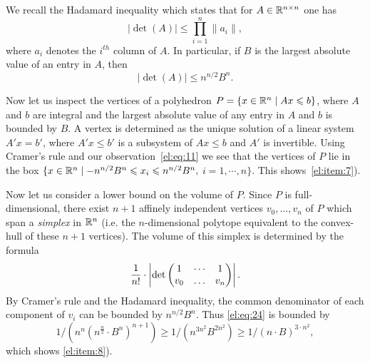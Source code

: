 We recall the Hadamard inequality which states that for $A \in
\mathbb{R}^{n\times n}$ one has 
\begin{equation}
  \label{el:eq:10}
  |\det(A)| \leq \prod_{i=1}^n \|a_i\|,
\end{equation}
where $a_i$ denotes the $i^{th}$ column of $A$.  In particular, if $B$
is the largest absolute value of an entry in $A$, then 
\begin{equation}
  \label{el:eq:11}
  |\det(A)| \leq n^{n/2} B^{n}. 
\end{equation}



Now let us inspect the vertices of a polyhedron $P = \{ x \in \mathbb{R}^n \mid
Ax\leqslant b\}$, where $A$ and $b$ are integral and the largest absolute
value of any entry in $A$ and $b$ is bounded by $B$. A vertex is
determined as the unique solution of a linear system $A'x=b'$, where
$A'x\leq b'$ is a subsystem of $Ax\leq b$ and $A'$ is invertible. Using
Cramer's rule and our observation~\eqref{el:eq:11} we see that the
vertices of $P$ lie in the box $\{x \in \mathbb{R}^n \mid -n^{n/2} B^n \leqslant x_i \leqslant n^{n/2} B^n,$ $i = 1,\cdots,n\}$.  This
shows~\ref{el:item:7}).


Now let us consider a lower bound on the volume of $P$. Since $P$ is
full-dimensional, there exist $n+1$ affinely independent vertices
$v_0,\ldots,v_n$ of $P$ which span a \emph{simplex} in $\mathbb{R}^{n}$ 
(i.e. the $n$-dimensional polytope equivalent to the convex-hull of 
these $n+1$ vertices). The
volume of this simplex is determined by the formula
\begin{equation}
  \label{el:eq:24}
  \frac{1}{n!} \cdot \left|\det \begin{pmatrix} 1 & \cdots & 1 \\ v_0& \ldots&v_n \end{pmatrix} \right|. 
\end{equation}
%
By Cramer's rule and the Hadamard inequality, the common  denominator
of each component of $v_i$ can be  bounded by $n^{n/2} B^n$. Thus
\eqref{el:eq:24} is bounded by 
\begin{equation}
  \label{el:eq:44}
  1 / \left(   n^n (n^{\frac{n}{2}} \cdot B^n)^{n+1}      \right) \geq  1 /
  \left(   n^{3n^2}   B^{2n^2}      \right) \geq 1 / (n\cdot B)^{3\cdot n^2},
\end{equation}
which shows \ref{el:item:8}). 


